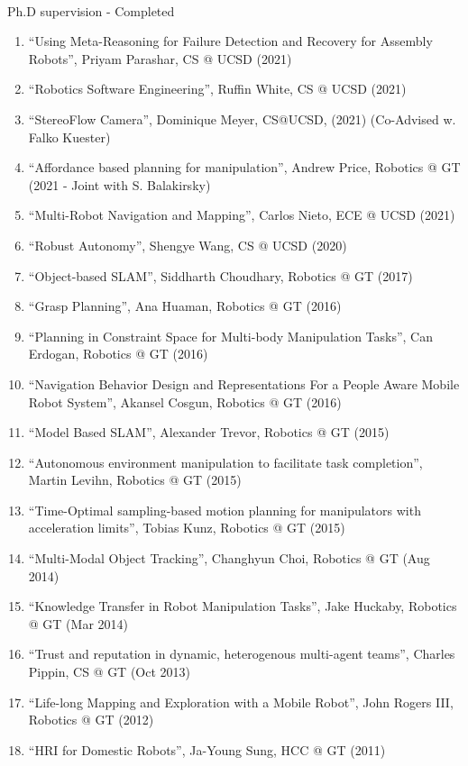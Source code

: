 \documentclass{article}
\begin{document}
\begin{cv}
\begin{cvlist}{~}
\item[Ph.D supervision - Completed]\ \\
  \begin{enumerate}
  \item ``Using Meta-Reasoning for Failure Detection and Recovery for
    Assembly Robots'', Priyam Parashar, CS @ UCSD (2021)
  \item ``Robotics Software Engineering'', Ruffin White, CS @ UCSD (2021)
  \item ``StereoFlow Camera'', Dominique Meyer, CS@UCSD, (2021)
    (Co-Advised w. Falko Kuester)
  \item ``Affordance based planning for manipulation'', Andrew Price,
    Robotics @ GT (2021 - Joint with S. Balakirsky)
  \item ``Multi-Robot Navigation and Mapping'', Carlos Nieto, ECE @ UCSD (2021)
  \item ``Robust Autonomy'', Shengye Wang, CS @ UCSD (2020)
  \item ``Object-based SLAM'', Siddharth Choudhary, Robotics @ GT (2017)
  \item ``Grasp Planning'', Ana Huaman, Robotics @ GT (2016)
  \item ``Planning in Constraint Space for Multi-body Manipulation
    Tasks'', Can Erdogan, Robotics @ GT (2016)
  \item ``Navigation Behavior Design and Representations For a People
    Aware Mobile Robot System'', Akansel Cosgun, Robotics @ GT (2016)
  \item ``Model Based SLAM'', Alexander Trevor, Robotics @ GT (2015)
  \item ``Autonomous environment manipulation to facilitate task
    completion'', Martin Levihn, Robotics @ GT (2015)
  \item ``Time-Optimal sampling-based motion planning for manipulators
    with acceleration limits'', Tobias Kunz, Robotics @ GT (2015)
  \item ``Multi-Modal Object Tracking'', Changhyun Choi, Robotics @ GT
    (Aug 2014)
  \item ``Knowledge Transfer in Robot Manipulation Tasks'', Jake
    Huckaby, Robotics @ GT (Mar 2014)
  \item ``Trust and reputation in dynamic, heterogenous multi-agent
    teams'', Charles Pippin, CS @ GT (Oct 2013)
  \item ``Life-long Mapping and Exploration with a Mobile Robot'',
    John Rogers III, Robotics @ GT (2012)
  \item ``HRI for Domestic Robots'', Ja-Young Sung, HCC @ GT (2011)

\end{enumerate}
\end{cvlist}
\end{cv}
\end{document}
